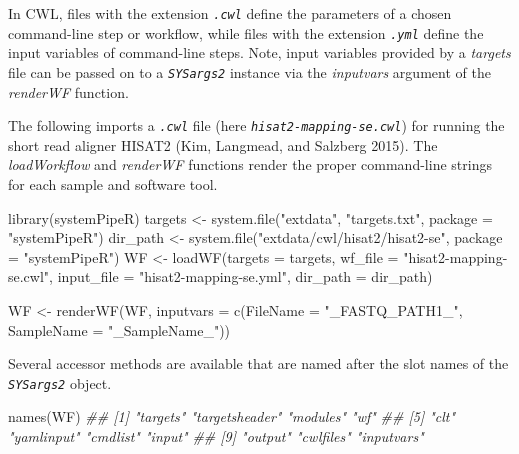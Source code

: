 \documentclass[14pt,]{article}
\newcommand{\hlstr}[1]{\textcolor[rgb]{0.251,0.627,0.251}{#1}}%
\newcommand{\hlcom}[1]{\textcolor[rgb]{0.502,0.502,0.502}{\textit{#1}}}%
\newcommand{\hlstd}[1]{\textcolor[rgb]{0.251,0.251,0.251}{#1}}%
\newenvironment{Shaded}{\begin{myshaded}}{\end{myshaded}}
\newcommand{\StringTok}[1]{\hlstr{#1}}
\newcommand{\DocumentationTok}[1]{\hlcom{#1}}
\newcommand{\OtherTok}[1]{{#1}}
\newcommand{\FunctionTok}[1]{\hlstd{#1}}
\newcommand{\AttributeTok}[1]{{#1}}
\newcommand{\NormalTok}[1]{\hlstd{#1}}
\begin{document}
In CWL, files with the extension \emph{\texttt{.cwl}} define the parameters of a chosen
command-line step or workflow, while files with the extension \emph{\texttt{.yml}} define
the input variables of command-line steps. Note, input variables provided
by a \emph{targets} file can be passed on to a \emph{\texttt{SYSargs2}} instance via the \emph{inputvars}
argument of the \emph{renderWF} function.

The following imports a \emph{\texttt{.cwl}} file (here \emph{\texttt{hisat2-mapping-se.cwl}}) for running
the short read aligner HISAT2 (Kim, Langmead, and Salzberg 2015). The \emph{loadWorkflow} and \emph{renderWF}
functions render the proper command-line strings for each sample and software tool.

\begin{Shaded}
\begin{Highlighting}[]
\FunctionTok{library}\NormalTok{(systemPipeR)}
\NormalTok{targets }\OtherTok{\textless{}{-}} \FunctionTok{system.file}\NormalTok{(}\StringTok{"extdata"}\NormalTok{, }\StringTok{"targets.txt"}\NormalTok{, }\AttributeTok{package =} \StringTok{"systemPipeR"}\NormalTok{)}
\NormalTok{dir\_path }\OtherTok{\textless{}{-}} \FunctionTok{system.file}\NormalTok{(}\StringTok{"extdata/cwl/hisat2/hisat2{-}se"}\NormalTok{, }\AttributeTok{package =} \StringTok{"systemPipeR"}\NormalTok{)}
\NormalTok{WF }\OtherTok{\textless{}{-}} \FunctionTok{loadWF}\NormalTok{(}\AttributeTok{targets =}\NormalTok{ targets, }\AttributeTok{wf\_file =} \StringTok{"hisat2{-}mapping{-}se.cwl"}\NormalTok{, }\AttributeTok{input\_file =} \StringTok{"hisat2{-}mapping{-}se.yml"}\NormalTok{, }
    \AttributeTok{dir\_path =}\NormalTok{ dir\_path)}

\NormalTok{WF }\OtherTok{\textless{}{-}} \FunctionTok{renderWF}\NormalTok{(WF, }\AttributeTok{inputvars =} \FunctionTok{c}\NormalTok{(}\AttributeTok{FileName =} \StringTok{"\_FASTQ\_PATH1\_"}\NormalTok{, }\AttributeTok{SampleName =} \StringTok{"\_SampleName\_"}\NormalTok{))}
\end{Highlighting}
\end{Shaded}

Several accessor methods are available that are named after the slot names of the \emph{\texttt{SYSargs2}} object.

\begin{Shaded}
\begin{Highlighting}[]
\FunctionTok{names}\NormalTok{(WF)}
\DocumentationTok{\#\#  [1] "targets"       "targetsheader" "modules"       "wf"           }
\DocumentationTok{\#\#  [5] "clt"           "yamlinput"     "cmdlist"       "input"        }
\DocumentationTok{\#\#  [9] "output"        "cwlfiles"      "inputvars"}
\end{Highlighting}
\end{Shaded}
\end{document}
